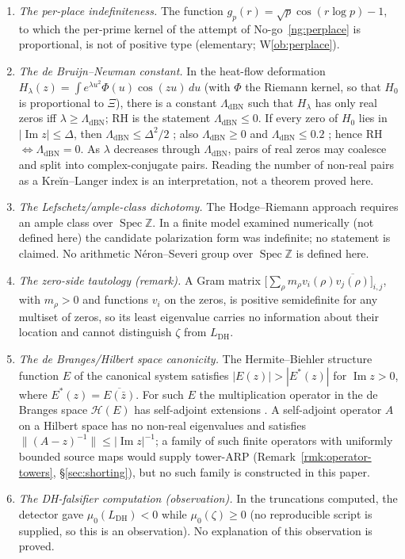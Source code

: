 \documentclass[11pt]{amsart}
\theoremstyle{definition}
\theoremstyle{remark}
\theoremstyle{definition}
\renewcommand{\Im}{\operatorname{Im}}
\newcommand{\Spec}{\operatorname{Spec}}
\begin{document}
\begin{enumerate}[label=(\roman*),leftmargin=2.2em]
\item \emph{The per-place indefiniteness.} The function $g_p(r)=\sqrt p\cos(r\log p)-1$, to which the
per-prime kernel of the attempt of No-go~\ref{ng:perplace} is proportional, is not of positive type
(elementary; W\ref{ob:perplace}).

\item \emph{The de Bruijn--Newman constant.} In the heat-flow deformation
$H_\lambda(z)=\int e^{\lambda u^2}\Phi(u)\cos(zu)\,du$ (with $\Phi$ the Riemann kernel, so that $H_0$ is
proportional to $\Xi$), there is a constant $\Lambda_{\mathrm{dBN}}$ such that $H_\lambda$ has only real
zeros iff $\lambda\ge\Lambda_{\mathrm{dBN}}$; RH is the statement $\Lambda_{\mathrm{dBN}}\le0$. If every
zero of $H_0$ lies in $|\Im z|\le\Delta$, then $\Lambda_{\mathrm{dBN}}\le\Delta^2/2$ \cite{deBruijn}; also
$\Lambda_{\mathrm{dBN}}\ge0$ \cite{RodgersTao} and $\Lambda_{\mathrm{dBN}}\le0.2$ \cite{PolymathDBN};
hence RH $\Longleftrightarrow\Lambda_{\mathrm{dBN}}=0$. As $\lambda$ decreases through
$\Lambda_{\mathrm{dBN}}$, pairs of real zeros may coalesce and split into complex-conjugate pairs. Reading
the number of non-real pairs as a Kreĭn--Langer index is an interpretation, not a theorem proved here.

\item \emph{The Lefschetz/ample-class dichotomy.} The Hodge--Riemann approach requires an ample class
over $\Spec\mathbb Z$. In a finite model examined numerically (not defined here) the candidate
polarization form was indefinite; no statement is claimed. No arithmetic N\'eron--Severi group over
$\Spec\mathbb Z$ is defined here.

\item \emph{The zero-side tautology (remark).} A Gram matrix
$\bigl[\sum_\rho m_\rho v_i(\rho)\overline{v_j(\rho)}\bigr]_{i,j}$, with $m_\rho>0$ and functions $v_i$
on the zeros, is positive semidefinite for any multiset of zeros, so its least eigenvalue carries no
information about their location and cannot distinguish $\zeta$ from $L_{\mathrm{DH}}$.

\item \emph{The de Branges/Hilbert space canonicity.} The Hermite--Biehler structure function $E$ of the
canonical system \cite{deBranges} satisfies $|E(z)|>|E^*(z)|$ for $\Im z>0$, where $E^*(z)=\overline{E(\bar z)}$.
For such $E$ the multiplication operator in the de Branges space $\mathcal H(E)$ has self-adjoint
extensions \cite{deBranges}. A self-adjoint operator $A$ on a Hilbert space has no non-real
eigenvalues and satisfies $\|(A-z)^{-1}\|\le|\Im z|^{-1}$; a family of such finite operators with
uniformly bounded source maps would supply tower-ARP (Remark~\ref{rmk:operator-towers},
\S\ref{sec:shorting}), but no such family is constructed in this paper.

\item \emph{The DH-falsifier computation (observation).} In the truncations computed, the detector gave
$\mu_0(L_{\mathrm{DH}})<0$ while $\mu_0(\zeta)\ge0$ (no reproducible script is supplied, so this is an
observation). No explanation of this observation is proved.

\end{enumerate}
\end{document}
